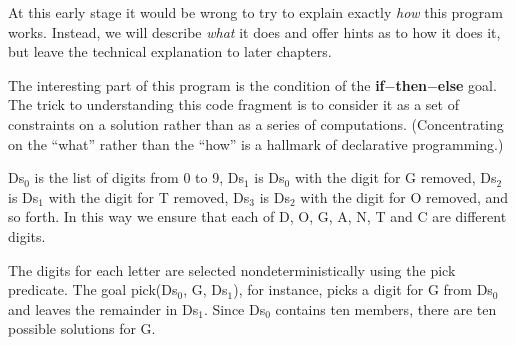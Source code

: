 \documentclass[a4paper,11pt,notitlepage,onecolumn]{book}
\begin{document}
\begin{small}
\begin{ptabular}
\nextline
{}
\nextline
{}
\nextline
{}
\nextline
{}
\nextline
\nextline
{}
\nextline
\nextline
{}
\nextline
{}
\nextline
\end{ptabular}

\end{small}
At this early stage it would be wrong to try to explain exactly \emph{how}
this program works.  Instead, we will describe \emph{what} it does and offer
hints as to how it does it, but leave the technical explanation to later
chapters.

The interesting part of this program is the condition of the \textsf{\textbf{if}{\ensuremath{-}}\textbf{then}{\ensuremath{-}}\textbf{else}}
goal.  The trick to understanding this code fragment is to consider it as a
set of constraints on a solution rather than as a series of computations.
(Concentrating on the ``what'' rather than the ``how'' is a hallmark of
declarative programming.)

\textsf{Ds$_{0}$} is the list of digits from 0 to 9, \textsf{Ds$_{1}$} is \textsf{Ds$_{0}$} with the digit for
\textsf{G} removed, \textsf{Ds$_{2}$} is \textsf{Ds$_{1}$} with the digit for \textsf{T} removed, \textsf{Ds$_{3}$} is \textsf{Ds$_{2}$}
with the digit for \textsf{O} removed, and so forth.  In this way we ensure that
each of \textsf{D}, \textsf{O}, \textsf{G}, \textsf{A}, \textsf{N}, \textsf{T} and \textsf{C} are different digits.

The digits for each letter are selected nondeterministically using the
\textsf{pick} predicate.  The goal \textsf{pick(Ds$_{0}$, G, Ds$_{1}$)}, for instance, picks a digit
for \textsf{G} from \textsf{Ds$_{0}$} and leaves the remainder in \textsf{Ds$_{1}$}.  Since \textsf{Ds$_{0}$} contains
ten members, there are ten possible solutions for \textsf{G}.
\end{document}
